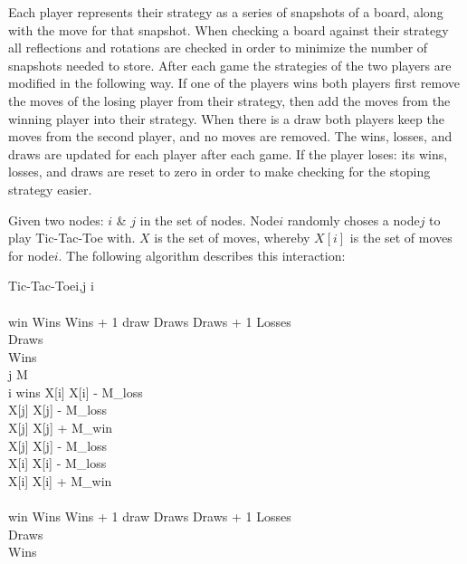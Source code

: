 \documentclass[11pt,twocolumn]{article}
\begin{document}
Each player represents their strategy as a series of snapshots of a board, along with the move for that snapshot.  When checking a board against their strategy all reflections and rotations are checked in order to minimize the number of snapshots needed to store.  After each game the strategies of the two players are modified in the following way.  If one of the players wins both players first remove the moves of the losing player from their strategy, then add the moves from the winning player into their strategy.  When there is a draw both players keep the moves from the second player, and no moves are removed.  The wins, losses, and draws are updated for each player after each game.  If the player loses: its wins, losses, and draws are reset to zero in order to make checking for the stoping strategy easier.

Given two nodes: $i$ \& $j$ in the set of nodes.  Node$i$ randomly choses a node$j$ to play Tic-Tac-Toe with.  $X$ is the set of moves, whereby $X[i]$ is the set of moves for node$i$.  The following algorithm describes this interaction:

\begin{pseudocode}[shadowbox]{Tic-Tac-Toe}{i,j}
\IF i \THEN
 \BEGIN
  \\
  \\
  \IF win \THEN
   Wins \GETS Wins + 1
  \ELSEIF draw \THEN
   Draws \GETS Draws + 1
  \ELSE
   \BEGIN
    Losses \\
    Draws \\
    Wins \\
   \END
 \END
\ELSEIF j \THEN
 \BEGIN
  M \GETS {}\\
  \IF i \space \mbox{wins} \THEN
   \BEGIN
    X[i] \GETS X[i] - M_{loss}\\
    X[j] \GETS X[j] - M_{loss}\\
    X[j] \GETS X[j] + M_{win}\\
   \END
  \ELSE \THEN
   \BEGIN
    X[j] \GETS X[j] - M_{loss}\\
    X[i] \GETS X[i] - M_{loss}\\
    X[i] \GETS X[i] + M_{win}\\
   \END \\
  \IF win \THEN
   Wins \GETS Wins + 1
  \ELSEIF draw \THEN
   Draws \GETS Draws + 1
  \ELSE
   \BEGIN
    Losses \\
    Draws \\
    Wins \\
   \END \\
  \\
 \END
\end{pseudocode}
\end{document}
